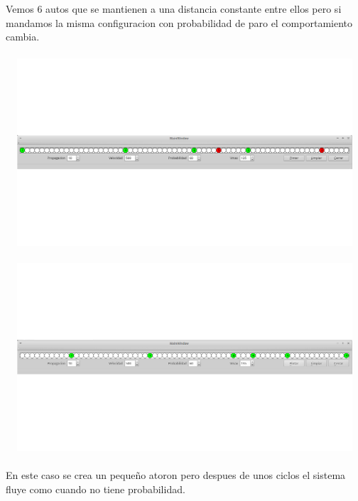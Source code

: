 \documentclass[a4paper,10pt]{article}
\begin{document}
\\ \\
Vemos 6 autos que se mantienen a una distancia constante entre ellos pero si mandamos la misma configuracion con probabilidad de paro el comportamiento cambia.
\\ \\
\includegraphics[width=15cm, height=7cm]{13}
\\ \\
\includegraphics[width=15cm, height=7cm]{14}
\\ \\
En este caso se crea un pequeño atoron pero despues de unos ciclos el sistema fluye como cuando no tiene probabilidad.
\end{document}

